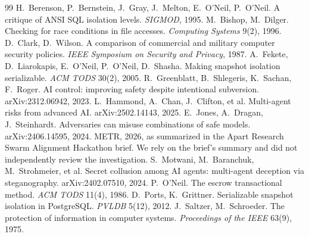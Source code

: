 \documentclass[10pt]{article}
\begin{document}
\vspace{-.7em}\begin{thebibliography}{99}\footnotesize\setlength{\itemsep}{0pt}
 H.~Berenson, P.~Bernstein, J.~Gray, J.~Melton, E.~O'Neil, P.~O'Neil. A critique of ANSI SQL isolation levels. \emph{SIGMOD}, 1995.
 M.~Bishop, M.~Dilger. Checking for race conditions in file accesses. \emph{Computing Systems} 9(2), 1996.
 D.~Clark, D.~Wilson. A comparison of commercial and military computer security policies. \emph{IEEE Symposium on Security and Privacy}, 1987.
 A.~Fekete, D.~Liarokapis, E.~O'Neil, P.~O'Neil, D.~Shasha. Making snapshot isolation serializable. \emph{ACM TODS} 30(2), 2005.
 R.~Greenblatt, B.~Shlegeris, K.~Sachan, F.~Roger. AI control: improving safety despite intentional subversion. arXiv:2312.06942, 2023.
 L.~Hammond, A.~Chan, J.~Clifton, et al. Multi-agent risks from advanced AI. arXiv:2502.14143, 2025.
 E.~Jones, A.~Dragan, J.~Steinhardt. Adversaries can misuse combinations of safe models. arXiv:2406.14595, 2024.
 METR, 2026, as summarized in the Apart Research Swarm Alignment Hackathon brief. We rely on the brief's summary and did not independently review the investigation.
 S.~Motwani, M.~Baranchuk, M.~Strohmeier, et al. Secret collusion among AI agents: multi-agent deception via steganography. arXiv:2402.07510, 2024.
 P.~O'Neil. The escrow transactional method. \emph{ACM TODS} 11(4), 1986.
 D.~Ports, K.~Grittner. Serializable snapshot isolation in PostgreSQL. \emph{PVLDB} 5(12), 2012.
 J.~Saltzer, M.~Schroeder. The protection of information in computer systems. \emph{Proceedings of the IEEE} 63(9), 1975.
\end{thebibliography}

\appendix
\end{document}
